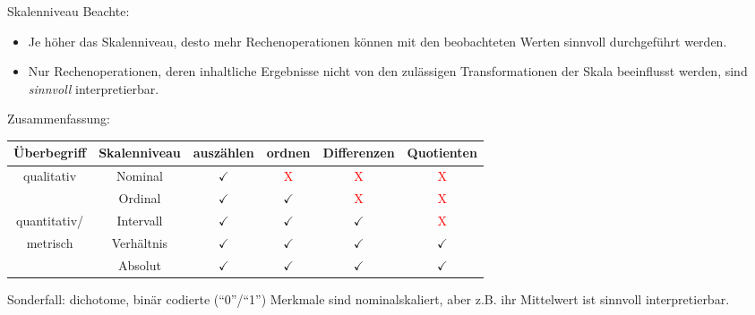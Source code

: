 \documentclass[
  10pt,
  ignorenonframetext,
]{beamer}
\providecommand{\tightlist}{%
  \setlength{\itemsep}{0pt}\setlength{\parskip}{0pt}}
\begin{document}
\begin{frame}{Skalenniveau}
\protect\hypertarget{skalenniveau}{}
Beachte:

\begin{itemize}
\tightlist
\item
  Je höher das Skalenniveau, desto mehr Rechenoperationen können mit den
  beobachteten Werten sinnvoll durchgeführt werden.
\item
  Nur Rechenoperationen, deren inhaltliche Ergebnisse nicht von den
  zulässigen Transformationen der Skala beeinflusst werden, sind
  \emph{sinnvoll} interpretierbar.
\end{itemize}

Zusammenfassung:

\begin{table}
\small
\begin{tabular}{cc|cccc}
Überbegriff &  Skalenniveau & ausz\"{a}hlen & ordnen & Differenzen & Quotienten \\ \hline
qualitativ & Nominal & $\checkmark$ & \textcolor{red}{X} & \textcolor{red}{X} & \textcolor{red}{X} \\
          & Ordinal & $\checkmark$ & $\checkmark$ & \textcolor{red}{X} & \textcolor{red}{X} \\ \hline
quantitativ/ &  Intervall & $\checkmark$ & $\checkmark$ & $\checkmark$ & \textcolor{red}{X} \\
metrisch    & Verh\"{a}ltnis & $\checkmark$ & $\checkmark$ & $\checkmark$ & $\checkmark$ \\
        & Absolut & $\checkmark$ & $\checkmark$ & $\checkmark$ & $\checkmark$ \\
\end{tabular}
\end{table}

Sonderfall: dichotome, binär codierte (``0''/``1'') Merkmale sind
nominalskaliert, aber z.B. ihr Mittelwert ist sinnvoll interpretierbar.
\end{frame}

\end{document}
